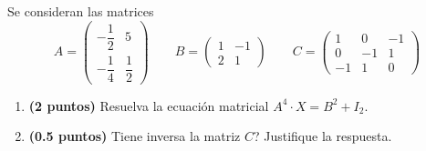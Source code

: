 
Se consideran las matrices
\[
A=\begin{pmatrix}-\dfrac{1}{2}&5\\[0.7em]-\dfrac{1}{4}&\dfrac{1}{2}\end{pmatrix}
\qquad B=\begin{pmatrix}1&-1\\2&1\end{pmatrix}
\qquad C=\begin{pmatrix}1&0&-1\\0&-1&1\\-1&1&0\end{pmatrix}
\]
\begin{enumerate}[label=\alph*),leftmargin=2.4em]
  \item \textbf{(2 puntos)} Resuelva la ecuación matricial \(A^4\cdot X=B^2+I_2\).
  \item \textbf{(0.5 puntos)} \textquestiondown{}Tiene inversa la matriz \(C\)? Justifique la respuesta.
\end{enumerate}
